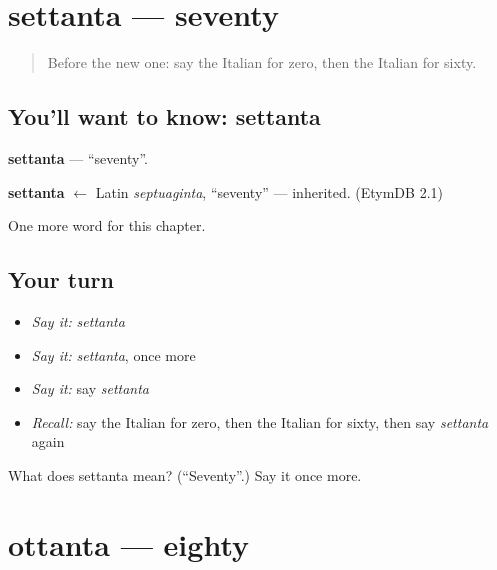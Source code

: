 \section[settanta]{settanta — seventy}

\label{lesson:IT-C132-settanta}



\begin{quote}
Before the new one: say the Italian for zero, then the Italian for sixty.
\end{quote}

\subsection*{You'll want to know: settanta}
\textbf{settanta} — \textquotedblleft{}seventy\textquotedblright{}.

\begin{cousinweb}
\textbf{settanta} $\leftarrow$ Latin \emph{septuaginta}, \textquotedblleft{}seventy\textquotedblright{} — inherited. (EtymDB 2.1)
\end{cousinweb}

\begin{grammarlens}[title={What you've built}]
One more word for this chapter.
\end{grammarlens}

\subsection*{Your turn}
\begin{itemize}
\raggedright
  \item \emph{Say it:} \emph{settanta}
  \item \emph{Say it:} \emph{settanta}, once more
  \item \emph{Say it:} say \emph{settanta}
  \item \emph{Recall:} say the Italian for zero, then the Italian for sixty, then say \emph{settanta} again
\end{itemize}

\begin{tcolorbox}[breakable,colback=teal!4,colframe=teal!35!black,title={Before you move on}]
What does settanta mean? (\textquotedblleft{}Seventy\textquotedblright{}.) Say it once more.
\end{tcolorbox}
\section[ottanta]{ottanta — eighty}

